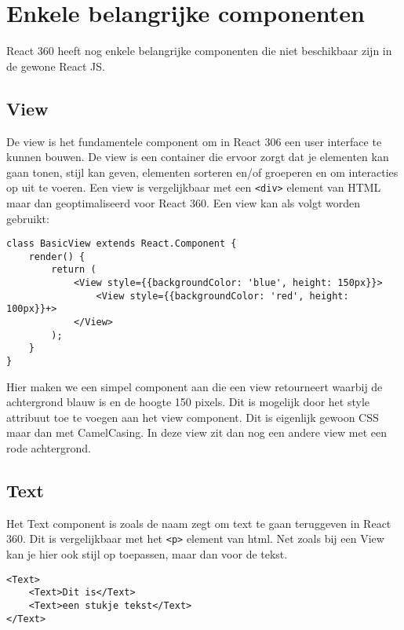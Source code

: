 \section{Enkele belangrijke componenten}
\label{sec:reactvr-componenten}
React 360 heeft nog enkele belangrijke componenten die niet beschikbaar zijn in de gewone React JS.

\subsection{View}
\label{subsec:view}
De view is het fundamentele component om in React 306 een user interface te kunnen bouwen. De view is een container die ervoor zorgt dat je elementen kan gaan tonen, stijl kan geven, elementen sorteren en/of groeperen en om interacties op uit te voeren. Een view is vergelijkbaar met een \lstinline[basicstyle=\ttfamily\color{red}]|<div>| element van HTML maar dan geoptimaliseerd voor React 360. Een view kan als volgt worden gebruikt:

\begin{lstlisting}[frame=single, caption=Een component die een View teruggeeft.]
class BasicView extends React.Component {
	render() {
		return (
			<View style={{backgroundColor: 'blue', height: 150px}}>
				<View style={{backgroundColor: 'red', height: 100px}}+>
			</View>
		);
	}
}
\end{lstlisting}

Hier maken we een simpel component aan die een view retourneert waarbij de achtergrond blauw is en de hoogte 150 pixels. Dit is mogelijk door het style attribuut toe te voegen aan het view component. Dit is eigenlijk gewoon CSS maar dan met CamelCasing. In deze view zit dan nog een andere view met een rode achtergrond.

\subsection{Text}
\label{subsec:text}
Het Text component is zoals de naam zegt om text te gaan teruggeven in React 360. Dit is vergelijkbaar met het \lstinline[basicstyle=\ttfamily\color{red}]|<p>| element van html. Net zoals bij een View kan je hier ook stijl op toepassen, maar dan voor de tekst.

\begin{lstlisting}[frame=single, caption=Het Text component met kinderen.]
<Text>
	<Text>Dit is</Text>
	<Text>een stukje tekst</Text>
</Text>
\end{lstlisting}

